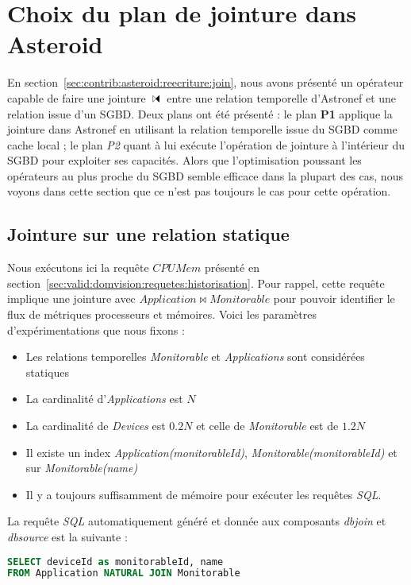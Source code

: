 \section{Choix du plan de jointure dans Asteroid}\label{sec:valid:perfs:couplage}
En section~\ref{sec:contrib:asteroid:reecriture:join}, nous avons présenté un opérateur capable de faire une jointure $\ssjoin$ entre une relation temporelle d'Astronef et une relation issue d'un SGBD. Deux plans ont été présenté : le plan \textbf{P1} applique la jointure dans Astronef en utilisant la relation temporelle issue du SGBD comme cache local ; le plan \textit{P2} quant à lui exécute l'opération de jointure à l'intérieur du SGBD pour exploiter ses capacités. Alors que l'optimisation poussant les opérateurs au plus proche du SGBD semble efficace dans la plupart des cas, nous voyons dans cette section que ce n'est pas toujours le cas pour cette opération.

\subsection{Jointure sur une relation statique}
Nous exécutons ici la requête $CPUMem$ présenté en section~\ref{sec:valid:domvision:requetes:historisation}. Pour rappel, cette requête implique une jointure avec $Application \Join Monitorable$ pour pouvoir identifier le flux de métriques processeurs et mémoires. Voici les paramètres d'expérimentations que nous fixons :
\begin{itemize}
	\item Les relations temporelles \textit{Monitorable} et \textit{Applications} sont considérées statiques
	\item La cardinalité d'\textit{Applications} est $N$
	\item La cardinalité de \textit{Devices} est $0.2N$ et celle de \textit{Monitorable} est de $1.2N$
	\item Il existe un index \textit{Application(monitorableId)}, \textit{Monitorable(monitorableId)} et sur \textit{Monitorable(name)}
	\item Il y a toujours suffisamment de mémoire pour exécuter les requêtes \textit{SQL}.
\end{itemize}

La requête \textit{SQL} automatiquement généré et donnée aux composants \textit{dbjoin} et \textit{dbsource} est la suivante :
\begin{lstlisting}[language=SQL]
SELECT deviceId as monitorableId, name 
FROM Application NATURAL JOIN Monitorable
\end{lstlisting}

